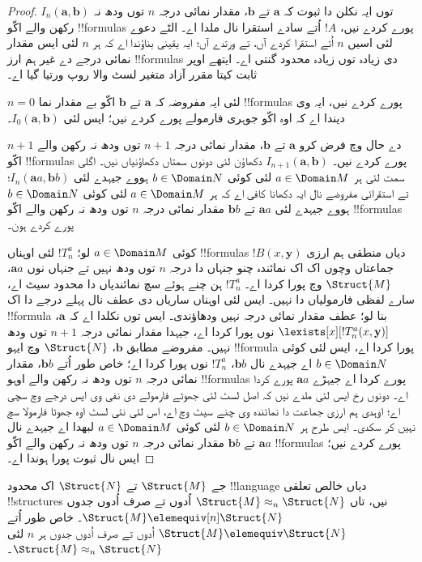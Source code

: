 \documentclass[../../../include/open-logic-section]{subfiles}
\begin{document}
\begin{proof}
  $I_n(\mathbf{a},\mathbf{b})$ توں ایہ نکلن دا ثبوت کہ
  $\mathbf{a}$ تے $\mathbf{b}$، مقدار نمائی درجہ $n$ توں
  ودھ نہ رکھن والے اکّو !!{formula}s پورے کردے نیں،
  $!A$ اُتے سادے استقرا نال ملدا اے۔ الٹے دعوے لئی اسیں
  $n$ اُتے استقرا کردے آں، تے  ورتدے آں؛
  ایہ یقینی بناؤندا اے کہ ہر $n$ لئی ایس مقدار نمائی درجے دے
  غیر ہم ارز !!{formula}s دی زیادہ توں زیادہ محدود گنتی اے۔
  ایتھے اوپر ثابت کیتا مقرر آزاد متغیر لسٹ والا روپ ورتیا گیا اے۔

  $n=0$ لئی ایہ مفروضہ کہ $\mathbf{a}$ تے $\mathbf{b}$ اکّو
  بے مقدار نما !!{formula}s پورے کردے نیں، ایہ وی دیندا اے کہ اوہ
  اکّو جوہری فارمولے پورے کردے نیں؛ ایس لئی
  $I_0(\mathbf{a},\mathbf{b})$۔

  $n+1$ دے حال وچ فرض کرو $\mathbf{a}$ تے $\mathbf{b}$،
  مقدار نمائی درجہ $n+1$ توں ودھ نہ رکھن والے اکّو
  !!{formula}s پورے کردے نیں۔ $I_{n+1}(\mathbf{a},\mathbf{b})$
  دکھاؤن لئی دونوں سمتاں دکھاؤنیاں نیں۔ اگلی سمت لئی ہر $a \in \Domain M$ لئی
  کوئی $b \in
  \Domain N$ ہووے جیہدے لئی $I_n(\mathbf{a}a,\mathbf{b}b)$؛
  تے استقرائی مفروضے نال ایہ دکھانا کافی اے کہ ہر $a \in
  \Domain M$ لئی کوئی $b \in \Domain N$ ہووے جیہدے لئی
  $\mathbf{a}a$ تے $\mathbf{b}b$ مقدار نمائی درجہ
  $n$ توں ودھ نہ رکھن والے اکّو !!{formula}s پورے کردے ہون۔

  کوئی $a \in \Domain M$ لو؛ $!T^a_n$ لئی اوہناں !!{formula}s
  $!B(x,\mathbf{y})$ دیاں منطقی ہم ارزی جماعتاں وچوں اک اک نمائندہ چنو
  جنہاں دا درجہ $n$ توں ودھ نہیں تے جنہاں نوں $\mathbf{a}a$، $\Struct{M}$ وچ پورا کردا اے۔
  $!T^a_n$ ہن چنے ہوئے سچ نمائندیاں دا محدود سیٹ اے، سارے لفظی فارمولیاں دا نہیں۔
  ایس لئی اوہناں ساریاں دی عطف نال پہلے درجے دا اک
  !!{formula} بنا لو؛ عطف مقدار نمائی درجہ نہیں ودھاؤندی۔ ایس توں نکلدا اے کہ
  $\mathbf{a}$، $\lexists[x][!T^a_n(x,\mathbf{y})]$ نوں پورا
  کردا اے، جیہدا مقدار نمائی درجہ $n+1$ توں ودھ نہیں۔
  مفروضے مطابق $\mathbf{b}$، $\Struct{N}$ وچ ایہو
  !!{formula} پورا کردا اے، ایس لئی کوئی $b \in \Domain N$ اے
  جیہدے نال $\mathbf{b}b$، $!T^a_n$ نوں پورا کردا اے؛ خاص طور
  اُتے $\mathbf{b}b$، مقدار نمائی درجہ $n$ توں ودھ نہ رکھن
  والے اوہو !!{formula}s پورے کردا اے جیہڑے $\mathbf{a}a$ پورے
  کردا اے۔ دونوں رخ ایس لئی ملدے نیں کہ اصل لسٹ لئی جھوٹے فارمولے
  دی نفی وی ایس درجے وچ سچی اے؛ اوہدی ہم ارزی جماعت دا نمائندہ وی
  چنے سیٹ وچ اے، اس لئی نئی لسٹ اوہ جھوٹا فارمولا سچ نہیں کر سکدی۔
  ایس طرح ہر $b \in \Domain N$ لئی کوئی
  $a\in \Domain M$ لبھدا اے جیہدے نال $\mathbf{a}a$ تے
  $\mathbf{b}b$ مقدار نمائی درجہ $n$ توں ودھ نہ رکھن والے
  اکّو !!{formula}s پورے کردے نیں؛ ایس نال ثبوت پورا ہوندا اے۔
\end{proof}

\begin{cor}
  جے $\Struct{M}$ تے $\Struct{N}$ اک محدود !!{language} دیاں
  خالص تعلقی !!{structure}s نیں، تاں $\Struct{M} \approx_n\Struct{N}$
  اُدوں تے صرف اُدوں جدوں $\Struct{M} \elemequiv[n] \Struct{N}$۔
  خاص طور اُتے $\Struct{M} \elemequiv \Struct{N}$ اُدوں تے
  صرف اُدوں جدوں ہر $n$ لئی $\Struct{M} \approx_n \Struct{N}$۔
\end{cor}
\end{document}
